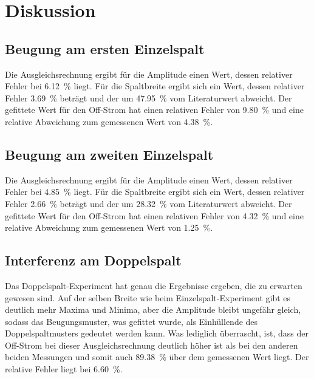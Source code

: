 \section{Diskussion}
\label{sec:Diskussion}


\subsection{Beugung am ersten Einzelspalt}
Die Ausgleichsrechnung ergibt für die Amplitude einen Wert, dessen relativer Fehler bei \SI{6.12}{\percent} liegt. Für die Spaltbreite ergibt sich ein Wert, dessen relativer Fehler \SI{3.69}{\percent} beträgt und der um \SI{47.95}{\percent} vom Literaturwert abweicht.
Der gefittete Wert für den Off-Strom hat einen relativen Fehler von \SI{9.80}{\percent} und eine relative Abweichung zum gemessenen Wert von \SI{4.38}{\percent}.


\subsection{Beugung am zweiten Einzelspalt}
Die Ausgleichsrechnung ergibt für die Amplitude einen Wert, dessen relativer Fehler bei \SI{4.85}{\percent} liegt. Für die Spaltbreite ergibt sich ein Wert, dessen relativer Fehler \SI{2.66}{\percent} beträgt und der um \SI{28.32}{\percent} vom Literaturwert abweicht.
Der gefittete Wert für den Off-Strom hat einen relativen Fehler von \SI{4.32}{\percent} und eine relative Abweichung zum gemessenen Wert von \SI{1.25}{\percent}.

\subsection{Interferenz am Doppelspalt}
Das Doppelspalt-Experiment hat genau die Ergebnisse ergeben, die zu erwarten gewesen sind. Auf der selben Breite  wie beim Einzelspalt-Experiment gibt es deutlich mehr Maxima und Minima, aber die Amplitude bleibt ungefähr gleich, sodass das Beugungsmuster, was gefittet wurde, als Einhüllende des Doppelspaltmusters gedeutet werden kann. Was lediglich überrascht, ist, dass der Off-Strom bei dieser Ausgleichsrechnung deutlich höher ist als bei den anderen beiden Messungen und somit auch \SI{89.38}{\percent} über dem gemessenen Wert liegt. Der relative Fehler liegt bei \SI{6.60}{\percent}.

